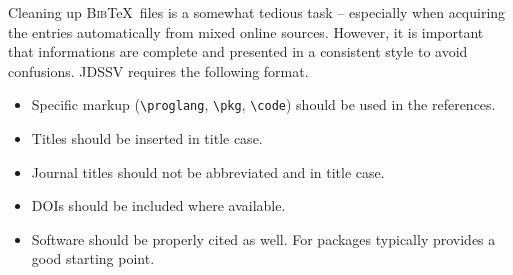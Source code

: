 \documentclass[
]{jdssv}
\providecommand{\tightlist}{%
  \setlength{\itemsep}{0pt}\setlength{\parskip}{0pt}}
\begin{document}
Cleaning up \textsc{Bib}\TeX~files is a somewhat tedious task --
especially when acquiring the entries automatically from mixed online
sources. However, it is important that informations are complete and
presented in a consistent style to avoid confusions. JDSSV requires the
following format.

\begin{itemize}
\tightlist
\item
  Specific markup (\verb|\proglang|, \verb|\pkg|, \verb|\code|) should
  be used in the references.
\item
  Titles should be inserted in title case.
\item
  Journal titles should not be abbreviated and in title case.
\item
  DOIs should be included where available.
\item
  Software should be properly cited as well. For  packages
   typically provides a good starting point.
\end{itemize}

\newpage
\end{document}
